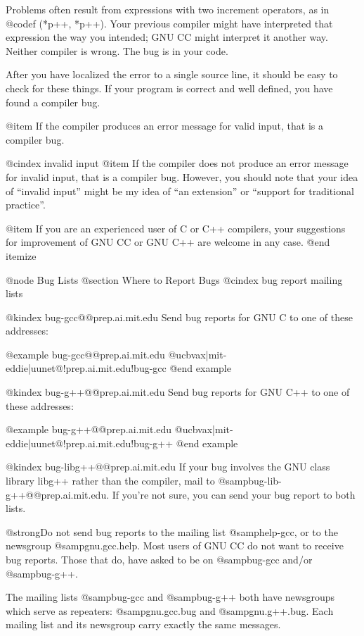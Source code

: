 Problems often result from expressions with two increment operators,
as in @code{f (*p++, *p++)}.  Your previous compiler might have
interpreted that expression the way you intended; GNU CC might
interpret it another way.  Neither compiler is wrong.  The bug is
in your code.

After you have localized the error to a single source line, it should
be easy to check for these things.  If your program is correct and
well defined, you have found a compiler bug.

@item
If the compiler produces an error message for valid input, that is a
compiler bug.

@cindex invalid input
@item
If the compiler does not produce an error message for invalid input,
that is a compiler bug.  However, you should note that your idea of
``invalid input'' might be my idea of ``an extension'' or ``support
for traditional practice''.

@item
If you are an experienced user of C or C++ compilers, your suggestions
for improvement of GNU CC or GNU C++ are welcome in any case.
@end itemize

@node Bug Lists
@section Where to Report Bugs
@cindex bug report mailing lists

@kindex bug-gcc@@prep.ai.mit.edu
Send bug reports for GNU C to one of these addresses:

@example
bug-gcc@@prep.ai.mit.edu
@{ucbvax|mit-eddie|uunet@}!prep.ai.mit.edu!bug-gcc
@end example

@kindex bug-g++@@prep.ai.mit.edu
Send bug reports for GNU C++ to one of these addresses:

@example
bug-g++@@prep.ai.mit.edu
@{ucbvax|mit-eddie|uunet@}!prep.ai.mit.edu!bug-g++
@end example

@kindex bug-libg++@@prep.ai.mit.edu
If your bug involves the GNU class library libg++ rather
than the compiler, mail to @samp{bug-lib-g++@@prep.ai.mit.edu}.  If
you're not sure, you can send your bug report to both lists.

@strong{Do not send bug reports to the mailing list @samp{help-gcc}, or
to the newsgroup @samp{gnu.gcc.help}.} Most users of GNU CC do not want
to receive bug reports.  Those that do, have asked to be on
@samp{bug-gcc} and/or @samp{bug-g++}.

The mailing lists @samp{bug-gcc} and @samp{bug-g++} both have newsgroups
which serve as repeaters: @samp{gnu.gcc.bug} and @samp{gnu.g++.bug}.
Each mailing list and its newsgroup carry exactly the same messages.

